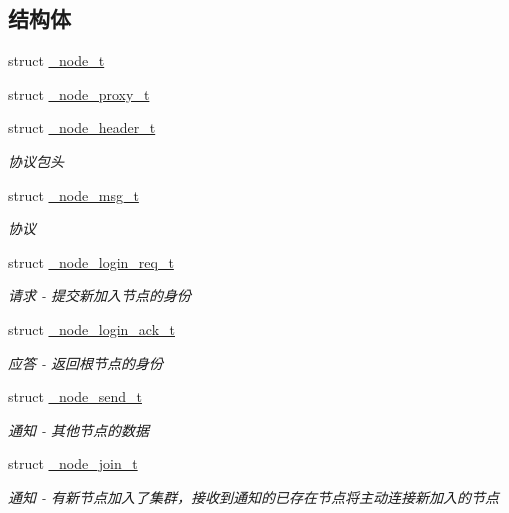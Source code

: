 \subsection*{结构体}
\begin{DoxyCompactItemize}
\item 
struct \hyperlink{a00042}{\+\_\+node\+\_\+t}
\item 
struct \hyperlink{a00040}{\+\_\+node\+\_\+proxy\+\_\+t}
\item 
struct \hyperlink{a00035}{\+\_\+node\+\_\+header\+\_\+t}
\begin{DoxyCompactList}\small\item\em 协议包头 \end{DoxyCompactList}\item 
struct \hyperlink{a00039}{\+\_\+node\+\_\+msg\+\_\+t}
\begin{DoxyCompactList}\small\item\em 协议 \end{DoxyCompactList}\item 
struct \hyperlink{a00038}{\+\_\+node\+\_\+login\+\_\+req\+\_\+t}
\begin{DoxyCompactList}\small\item\em 请求 -\/ 提交新加入节点的身份 \end{DoxyCompactList}\item 
struct \hyperlink{a00037}{\+\_\+node\+\_\+login\+\_\+ack\+\_\+t}
\begin{DoxyCompactList}\small\item\em 应答 -\/ 返回根节点的身份 \end{DoxyCompactList}\item 
struct \hyperlink{a00041}{\+\_\+node\+\_\+send\+\_\+t}
\begin{DoxyCompactList}\small\item\em 通知 -\/ 其他节点的数据 \end{DoxyCompactList}\item 
struct \hyperlink{a00036}{\+\_\+node\+\_\+join\+\_\+t}
\begin{DoxyCompactList}\small\item\em 通知 -\/ 有新节点加入了集群，接收到通知的已存在节点将主动连接新加入的节点 \end{DoxyCompactList}\end{DoxyCompactItemize}
